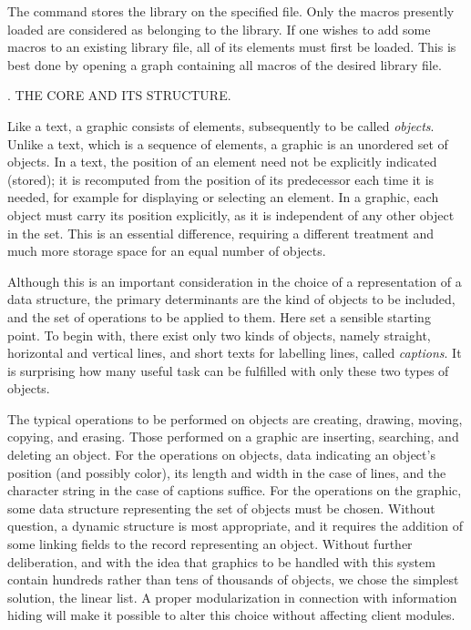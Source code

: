 The command  stores the library  on the specified file. Only the macros presently loaded are considered as belonging to the library. If one wishes to add some macros to an existing library file, all of its elements must first be loaded. This is best done by opening a graph containing all macros of the desired library file.

. THE CORE AND ITS STRUCTURE.

Like a text, a graphic consists of elements, subsequently to be called \emph{objects}. Unlike a text, which is a sequence of elements, a graphic is an unordered set of objects. In a text, the position of an element need not be explicitly indicated (stored); it is recomputed from the position of its predecessor each time it is needed, for example for displaying or selecting an element. In a graphic, each object must carry its position explicitly, as it is independent of any other object in the set. This is an essential difference, requiring a different treatment and much more storage space for an equal number of objects.

Although this is an important consideration in the choice of a representation of a data structure, the primary determinants are the kind of objects to be included, and the set of operations to be applied to them. Here  set a sensible starting point. To begin with, there exist only two kinds of objects, namely straight, horizontal and vertical lines, and short texts for labelling lines, called \emph{captions}. It is surprising how many useful task can be fulfilled with only these two types of objects.

The typical operations to be performed on objects are creating, drawing, moving, copying, and erasing. Those performed on a graphic are inserting, searching, and deleting an object. For the operations on objects, data indicating an object's position (and possibly color), its length and width in the case of lines, and the character string in the case of captions suffice. For the operations on the graphic, some data structure representing the set of objects must be chosen. Without question, a dynamic structure is most appropriate, and it requires the addition of some linking fields to the record representing an object. Without further deliberation, and with the idea that graphics to be handled with this system contain hundreds rather than tens of thousands of objects, we chose the simplest solution, the linear list. A proper modularization in connection with information hiding will make it possible to alter this choice without affecting client modules.

